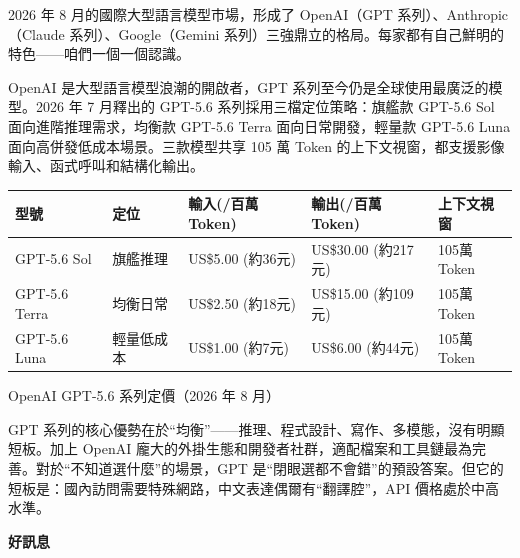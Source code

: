


2026 年 8 月的國際大型語言模型市場，形成了 OpenAI（GPT 系列）、Anthropic（Claude 系列）、Google（Gemini 系列）三強鼎立的格局。每家都有自己鮮明的特色——咱們一個一個認識。


OpenAI 是大型語言模型浪潮的開啟者，GPT 系列至今仍是全球使用最廣泛的模型。2026 年 7 月釋出的 GPT-5.6 系列採用三檔定位策略：旗艦款 GPT-5.6 Sol 面向進階推理需求，均衡款 GPT-5.6 Terra 面向日常開發，輕量款 GPT-5.6 Luna 面向高併發低成本場景。三款模型共享 105 萬 Token 的上下文視窗，都支援影像輸入、函式呼叫和結構化輸出。

\begin{center}
\begin{tabularx}{\linewidth}{|X|X|X|X|X|}
\hline
\textbf{型號} & \textbf{定位} & \textbf{輸入(/百萬Token)} & \textbf{輸出(/百萬Token)} & \textbf{上下文視窗} \tabularnewline
\hline
GPT-5.6 Sol & 旗艦推理 & US\$5.00 (約36元) & US\$30.00 (約217元) & 105萬Token \tabularnewline
GPT-5.6 Terra & 均衡日常 & US\$2.50 (約18元) & US\$15.00 (約109元) & 105萬Token \tabularnewline
GPT-5.6 Luna & 輕量低成本 & US\$1.00 (約7元) & US\$6.00 (約44元) & 105萬Token \tabularnewline
\hline
\end{tabularx}
\end{center}

\begin{center}\small\color{gray}OpenAI GPT-5.6 系列定價（2026 年 8 月）\end{center}

GPT 系列的核心優勢在於“均衡”——推理、程式設計、寫作、多模態，沒有明顯短板。加上 OpenAI 龐大的外掛生態和開發者社群，適配檔案和工具鏈最為完善。對於“不知道選什麼”的場景，GPT 是“閉眼選都不會錯”的預設答案。但它的短板是：國內訪問需要特殊網路，中文表達偶爾有“翻譯腔”，API 價格處於中高水準。

\textbf{好訊息}\par

